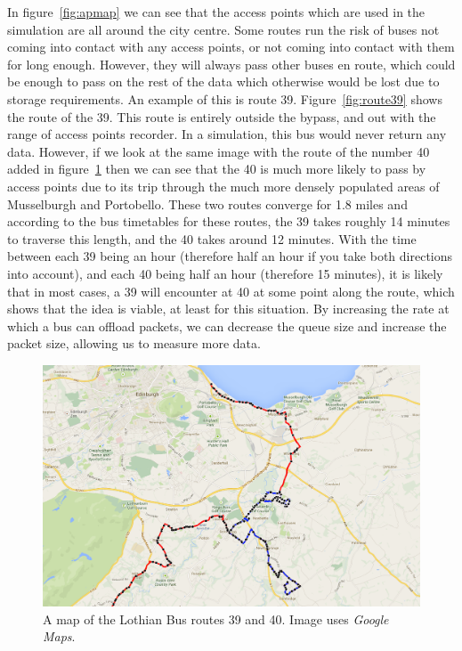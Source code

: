 \documentclass[12pt,a4paper,notitlepage]{article}
\begin{document}
In figure~\ref{fig:apmap} we can see that the access points which are used in the simulation are all around the city centre. Some routes run the risk of buses not coming into contact with any access points, or not coming into contact with them for long enough. However, they will always pass other buses en route, which could be enough to pass on the rest of the data which otherwise would be lost due to storage requirements. An example of this is route 39. Figure~\ref{fig:route39} shows the route of the 39. This route is entirely outside the bypass, and out with the range of access points recorder. In a simulation, this bus would never return any data. However, if we look at the same image with the route of the number 40 added in figure~\ref{fig:route3940} then we can see that the 40 is much more likely to pass by access points due to its trip through the much more densely populated areas of Musselburgh and Portobello. These two routes converge for 1.8 miles and according to the bus timetables for these routes, the 39 takes roughly 14 minutes to traverse this length, and the 40 takes around 12 minutes. With the time between each 39 being an hour (therefore half an hour if you take both directions into account), and each 40 being half an hour (therefore 15 minutes), it is likely that in most cases, a 39 will encounter at 40 at some point along the route, which shows that the idea is viable, at least for this situation. By increasing the rate at which a bus can offload packets, we can decrease the queue size and increase the packet size, allowing us to measure more data. 
 
\begin{figure}[H]
    \begin{center}
        \includegraphics[width=\textwidth]{../images/Route3940.png}
        \caption{A map of the Lothian Bus routes 39 and 40. Image uses \emph{Google Maps}.}
        \label{fig:route3940}
    \end{center}
\end{figure}
\end{document}
